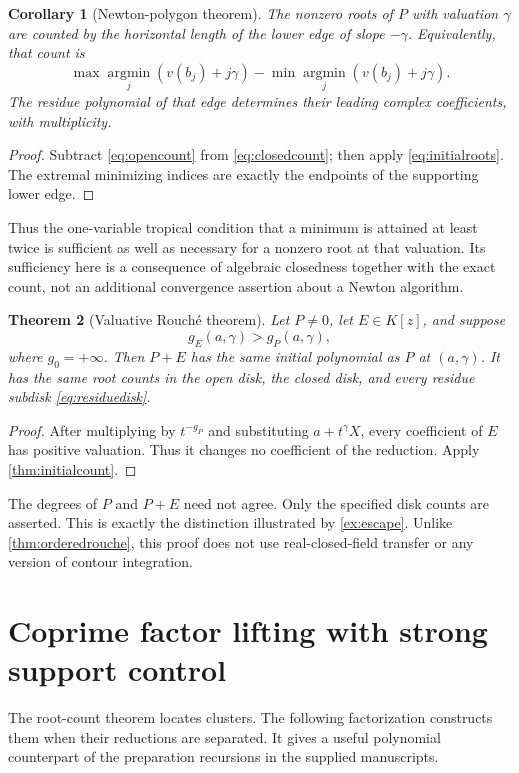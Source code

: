 \documentclass[11pt,letterpaper,oneside]{article}
\numberwithin{equation}{section}
\newtheorem{theorem}{Theorem}[section]
\newtheorem{corollary}[theorem]{Corollary}
\theoremstyle{definition}
\theoremstyle{remark}\newtheorem{remark}[theorem]{Remark}
\begin{document}
\begin{corollary}[Newton-polygon theorem]\label{cor:newtonpolygon}
The nonzero roots of $P$ with valuation $\gamma$ are counted by the
horizontal length of the lower edge of slope $-\gamma$. Equivalently,
that count is
\[
 \max\operatorname*{argmin}_j(v(b_j)+j\gamma)
 -\min\operatorname*{argmin}_j(v(b_j)+j\gamma).
\]
The residue polynomial of that edge determines their leading complex
coefficients, with multiplicity.
\end{corollary}
\begin{proof}
Subtract \eqref{eq:opencount} from \eqref{eq:closedcount}; then apply
\eqref{eq:initialroots}. The extremal minimizing indices are exactly
the endpoints of the supporting lower edge.
\end{proof}
Thus the one-variable tropical condition that a minimum is attained at
least twice is sufficient as well as necessary for a nonzero root at
that valuation. Its sufficiency here is a consequence of algebraic
closedness together with the exact count, not an additional convergence
assertion about a Newton algorithm.

\begin{theorem}[Valuative Rouch\'e theorem]\label{thm:valrouche}
Let $P\ne0$, let $E\in K[z]$, and suppose
\begin{equation}\label{eq:valrouchehyp}
 g_E(a,\gamma)>g_P(a,\gamma),
\end{equation}
where $g_0=+\infty$. Then $P+E$ has the same initial polynomial as $P$
at $(a,\gamma)$. It has the same root counts in the open disk, the closed
disk, and every residue subdisk \eqref{eq:residuedisk}.
\end{theorem}
\begin{proof}
After multiplying by $t^{-g_P}$ and substituting $a+t^\gamma X$, every
coefficient of $E$ has positive valuation. Thus it changes no coefficient
of the reduction. Apply \cref{thm:initialcount}.
\end{proof}
The degrees of $P$ and $P+E$ need not agree. Only the specified disk counts
are asserted. This is exactly the distinction illustrated by
\cref{ex:escape}. Unlike \cref{thm:orderedrouche}, this proof does not use
real-closed-field transfer or any version of contour integration.

\section{Coprime factor lifting with strong support control}\label{sec:hensel}
The root-count theorem locates clusters. The following factorization
constructs them when their reductions are separated. It gives a useful
polynomial counterpart of the preparation recursions in the supplied
manuscripts.
\end{document}
